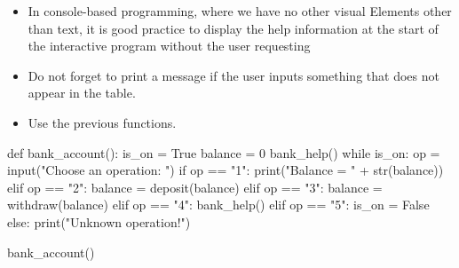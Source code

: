 \documentclass[12pt]{article}
\begin{document}
\begin{enumerate}[a)]
\begin{itemize}
        as a string (In other words, no need to use the try/except shown before 
        to avoid trying to convert things that may not be numbers into integers
        or floats) 
      \item In console-based programming, where we have no other visual Elements
        other than text, it is good practice to display the help information
        at the start of the interactive program without the user requesting
      \item Do not forget to print a message if the user inputs something that
        does not appear in the table.
      \item Use the previous functions.
    \end{itemize}
\begin{pythonlst}
def bank_account():
  is_on = True
  balance = 0
  bank_help()
  while is_on:
    op = input("Choose an operation: ")
    if op == "1":
      print("Balance = " + str(balance))
    elif op == "2":
      balance = deposit(balance)
    elif op == "3":
      balance = withdraw(balance)
    elif op == "4":
      bank_help()
    elif op == "5":
      is_on = False
    else:
      print("Unknown operation!")

bank_account()
\end{pythonlst}
\end{enumerate}
\end{document}
